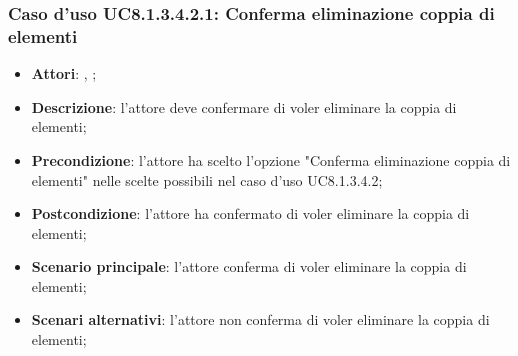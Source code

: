 		\subsubsection{Caso d'uso UC8.1.3.4.2.1: Conferma eliminazione coppia di elementi}
		\label{UC8.1.3.4.2.1}
		\begin{itemize}
			\item \textbf{Attori}: \uau, \uaupro;
			\item \textbf{Descrizione}: l'attore deve confermare di voler eliminare la coppia di elementi;
			\item \textbf{Precondizione}: l'attore ha scelto l'opzione "Conferma eliminazione coppia di elementi" nelle scelte possibili nel caso d'uso UC8.1.3.4.2;
			\item \textbf{Postcondizione}: l'attore ha confermato di voler eliminare la coppia di elementi;
			\item \textbf{Scenario principale}: l'attore conferma di voler eliminare la coppia di elementi;
			\item \textbf{Scenari alternativi}: l'attore non conferma di voler eliminare la coppia di elementi; 
		\end{itemize}

